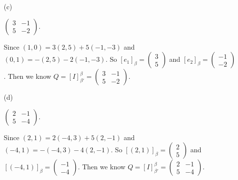 \begin{Exercise}
\begin{enumerate}[(a)]
		\item[(c)]
		\begin{answer}
			$\begin{pmatrix}
			3 & -1 \\
			5 & -2
			\end{pmatrix}$.
		\end{answer}
		\begin{solution}
			Since $(1,0) = 3(2,5)+5(-1,-3)$ and $(0,1) = -(2,5)-2(-1,-3)$. So $[e_1]_{\beta} = \begin{pmatrix}
			3 \\
			5
			\end{pmatrix}$ and $[e_2]_{\beta} = \begin{pmatrix}
			-1 \\
			-2
			\end{pmatrix}$. Then we know $Q = [I]_{\beta'}^{\beta} = \begin{pmatrix}
			3 & -1 \\
			5 & -2
			\end{pmatrix}$.
		\end{solution}
		
		\item[(d)]
		\begin{answer}
			$\begin{pmatrix}
			2 & -1 \\
			5 & -4
			\end{pmatrix}$.
		\end{answer}
		\begin{solution}
			Since $(2,1) = 2(-4,3)+5(2,-1)$ and $(-4,1) = -(-4,3)-4(2,-1)$. So $[(2,1)]_{\beta} = \begin{pmatrix}
			2 \\
			5
			\end{pmatrix}$ and $[(-4,1)]_{\beta} = \begin{pmatrix}
			-1 \\
			-4
			\end{pmatrix}$. Then we know $Q = [I]_{\beta'}^{\beta} = \begin{pmatrix}
			2 & -1 \\
			5 & -4
			\end{pmatrix}$.
		\end{solution}
		
	\end{enumerate}
\end{Exercise}